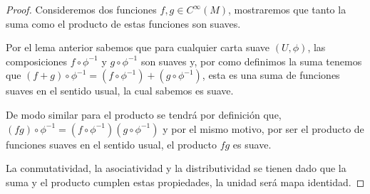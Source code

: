 \begin{proof}
  Consideremos dos funciones $f,g \in C^{\infty}(M)$, mostraremos que tanto la suma como el producto de estas funciones son suaves.

  Por el lema anterior sabemos que para cualquier carta suave $(U,\phi)$, las composiciones $f \circ \phi^{-1}$ y $g \circ \phi^{-1}$ son suaves y, por como definimos la suma tenemos que $(f + g)\circ \phi^{-1} = (f \circ \phi^{-1}) + (g \circ \phi^{-1})$, esta es una suma de funciones suaves en el sentido usual, la cual sabemos es suave.

  De modo similar para el producto se tendrá por definición que, $(fg)\circ\phi^{-1} = (f \circ \phi^{-1}) (g \circ \phi^{-1})$ y por el mismo motivo, por ser el producto de funciones suaves en el sentido usual, el producto $fg$ es suave.

  La conmutatividad, la asociatividad y la distributividad se tienen dado que la suma y el producto cumplen estas propiedades, la unidad será mapa identidad.
\end{proof}
